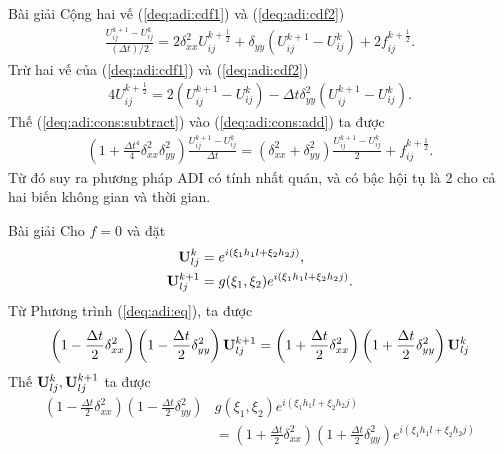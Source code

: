 \documentclass[9pt]{beamer}
\numberwithin{equation}{section}
\begin{document}
\begin{frame}
\begin{exampleblock}{Bài giải}
    Cộng hai vế (\ref{deq:adi:cdf1}) và (\ref{deq:adi:cdf2})
    \begin{align}
        \frac{U_{ij}^{k+1} - U_{ij}^k}{(\Delta t)/2} =
        2\delta_{xx}^2 U_{ij}^{k+\frac{1}{2}} +
        \delta_{yy}\left(U_{ij}^{k+1} - U_{ij}^k\right) +
        2 f_{ij}^{k+\frac{1}{2}}. \label{deq:adi:cons:add}
    \end{align}
    Trừ hai vế của (\ref{deq:adi:cdf1}) và (\ref{deq:adi:cdf2})
    \begin{align}
        4U_{ij}^{k+\frac{1}{2}} =
        2\left(U_{ij}^{k+1} - U_{ij}^k\right) -
        \Delta t \delta_{yy}^2 \left(U_{ij}^{k+1} - U_{ij}^k\right). \label{deq:adi:cons:subtract}
    \end{align}
    Thế (\ref{deq:adi:cons:subtract}) vào (\ref{deq:adi:cons:add}) ta được
    \begin{align*}
        \left(1 + \frac{\Delta t^4}{4} \delta_{xx}^2 \delta_{yy}^2\right) \frac{U_{ij}^{k+1} - U_{ij}^k}{\Delta t} =
        \left(\delta_{xx}^2 + \delta_{yy}^2\right) \frac{U_{ij}^{k+1} - U_{ij}^k}{2} + f_{ij}^{k+\frac{1}{2}}.
    \end{align*}
    Từ đó suy ra phương pháp ADI có tính nhất quán, và có bậc hội tụ là 2 cho cả hai biến không gian và thời gian.
\end{exampleblock}
\end{frame}

\begin{frame}
\begin{exampleblock}{Bài giải}
    Cho $f = 0$ và đặt
    \begin{align*}
        {\bf U}_{lj}^k &= e^{i(\xi_1 h_1 l + \xi_2 h_2 j)}, \\
        {\bf U}_{lj}^{k+1} &= g(\xi_1, \xi_2) e^{i(\xi_1 h_1 l + \xi_2 h_2 j)}.
    \end{align*}
    Từ Phương trình (\ref{deq:adi:eq}), ta được
    \begin{align*}
        \left(1 - \frac{\Delta t}{2} \delta_{xx}^2\right) \left(1 - \frac{\Delta t}{2} \delta_{yy}^2\right) {\bf U}_{lj}^{k+1} =
        \left(1 + \frac{\Delta t}{2} \delta_{xx}^2\right) \left(1 + \frac{\Delta t}{2} \delta_{yy}^2\right) {\bf U}_{lj}^k
    \end{align*}
    Thế ${\bf U}_{lj}^k, {\bf U}_{lj}^{k+1}$ ta được
    \begin{align*}
        \left(1 - \frac{\Delta t}{2} \delta_{xx}^2\right) \left(1 - \frac{\Delta t}{2} \delta_{yy}^2\right) &g(\xi_1, \xi_2) e^{i(\xi_1 h_1 l + \xi_2 h_2 j)} \\&=
        \left(1 + \frac{\Delta t}{2} \delta_{xx}^2\right) \left(1 + \frac{\Delta t}{2} \delta_{yy}^2\right) e^{i(\xi_1 h_1 l + \xi_2 h_2 j)}
    \end{align*}
\end{exampleblock}
\end{frame}
\end{document}
